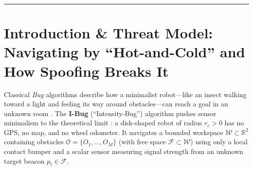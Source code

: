 \documentclass[11pt, a4paper]{article}
\begin{document}
\hrule
\medskip

\section{Introduction \& Threat Model: Navigating by ``Hot-and-Cold'' and How Spoofing Breaks It}
Classical \textit{Bug} algorithms describe how a minimalist robot—like an insect walking toward a light and feeling its way around obstacles—can reach a goal in an unknown room \cite{lumelsky1987path, kamon1998tangentbug}. The \textbf{I-Bug} (``Intensity-Bug'') algorithm pushes sensor minimalism to the theoretical limit \cite{taylor2009ibug, taylor2014intensity}: a disk-shaped robot of radius $r_c > 0$ has no GPS, no map, and no wheel odometer. It navigates a bounded workspace $\mathcal{W} \subset \mathbb{R}^2$ containing obstacles $\mathcal{O} = \{O_1, \dots, O_M\}$ (with free space $\mathcal{F} \subset \mathcal{W}$) using only a local contact bumper and a scalar sensor measuring signal strength from an unknown target beacon $p_t \in \mathcal{F}$.
\end{document}
